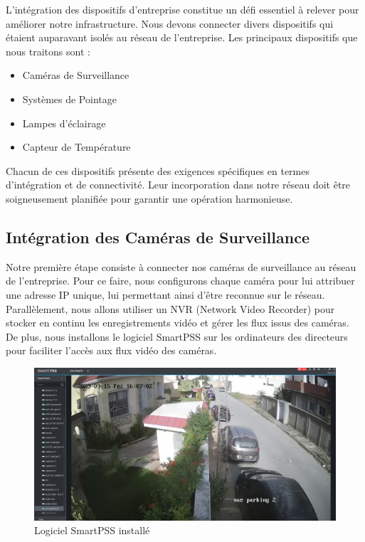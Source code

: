 L'intégration des dispositifs d'entreprise constitue un défi essentiel à relever pour améliorer notre infrastructure. Nous devons connecter divers dispositifs qui étaient auparavant isolés au réseau de l'entreprise. Les principaux dispositifs que nous traitons sont :


\begin{itemize}
\item Caméras de Surveillance

\item Systèmes de Pointage

\item Lampes d'éclairage

\item Capteur de Température
\end{itemize}

Chacun de ces dispositifs présente des exigences spécifiques en termes d'intégration et de connectivité. Leur incorporation dans notre réseau doit être soigneusement planifiée pour garantir une opération harmonieuse.

\subsection{Intégration des Caméras de Surveillance}

Notre première étape consiste à connecter nos caméras de surveillance au réseau de l'entreprise. Pour ce faire, nous configurons chaque caméra pour lui attribuer une adresse IP unique, lui permettant ainsi d'être reconnue sur le réseau. Parallèlement, nous allons utiliser un NVR (Network Video Recorder) pour stocker en continu les enregistrements vidéo et gérer les flux issus des caméras. De plus, nous installons le logiciel SmartPSS sur les ordinateurs des directeurs pour faciliter l'accès aux flux vidéo des caméras.

\begin{figure}[H]
\centering
\includegraphics[width=15cm]{Images/SmartPSS1.png}
\caption{Logiciel SmartPSS installé}
\label{Chap4.2.4}
\end{figure}
\smallskip

